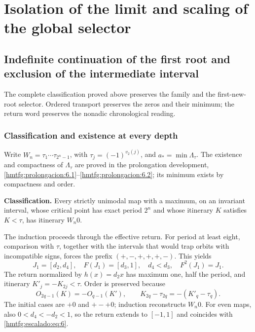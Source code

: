 \section{Isolation of the limit and scaling of the global selector}
\label{hmtfg:fragmento:aislamiento-del-limite-y-escalado-del-selector-global}

\subsection{Indefinite continuation of the first root and exclusion of the intermediate interval}
\label{hmtfg:escalado:15}

The complete classification proved above preserves the family and the first-new-root selector. Ordered transport preserves the zeros and their minimum; the return word preserves the nonadic chronological reading.

\subsubsection{Classification and existence at every depth}
\label{hmtfg:escalado:15.1}

Write \(W_n=\tau_1\cdots\tau_{2^n-1}\), with \(\tau_j=(-1)^{v_2(j)}\), and \(a_*=\min\Lambda_\tau\). The existence and compactness of \(\Lambda_\tau\) are proved in the prolongation development, \ref{hmtfg:prolongacion:6.1}–\ref{hmtfg:prolongacion:6.2}; its minimum exists by compactness and order.

\textbf{Classification.} Every strictly unimodal map with a maximum, on an invariant interval, whose critical point has exact period \(2^n\) and whose itinerary \(K\) satisfies \(K<\tau\), has itinerary \(W_n0\).

The induction proceeds through the effective return. For period at least eight, comparison with \(\tau\), together with the intervals that would trap orbits with incompatible signs, forces the prefix \((+,-,+,+,+,-)\). This yields
\[
J_1=[d_2,d_4],\quad F(J_1)=[d_3,1],\quad
d_4<d_3,\quad F^2(J_1)=J_1.
\]
The return normalized by \(h(x)=d_2x\) has maximum one, half the period, and itinerary \(K'_j=-K_{2j}<\tau\). Order is preserved because
\[
O_{2q-1}(K)=-O_{q-1}(K'),\qquad
K_{2q}-\tau_{2q}=-(K'_q-\tau_q).
\]
The initial cases are \(+0\) and \(+-+0\); induction reconstructs \(W_n0\). For even maps, also \(0<d_4<-d_2<1\), so the return extends to \([-1,1]\) and coincides with \eqref{hmtfg:escalado:eq:6}.

